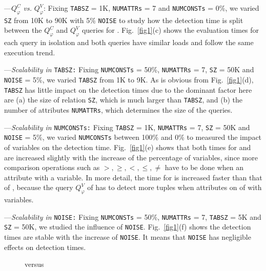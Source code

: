 \noindent---$Q_\varphi^C$ \textit{vs.} $Q_\varphi^V$: Fixing \texttt{TABSZ} = 1K, \texttt{NUMATTRs} = 7 and \texttt{NUMCONSTs} = 0\%, we varied \texttt{SZ} from 10K to 90K with 5\% \texttt{NOISE} to study how the detection time is split between the $Q_\varphi^C$ and $Q_\varphi^V$ queries for \pCFDs. Fig.~\ref{fig1}(c) shows the evaluation times for each query in isolation and both queries have similar loads and follow the same execution trend.

\noindent---\textit{Scalability in} \texttt{TABSZ:} Fixing \texttt{NUMCONSTs} = 50\%, \texttt{NUMATTRs} = 7, \texttt{SZ} = 50K and \texttt{NOISE} = 5\%, we varied \texttt{TABSZ} from 1K to 9K. As is obvious from Fig.~\ref{fig1}(d), \texttt{TABSZ} has little impact on the detection times due to the dominant factor here are (a) the size of relation \texttt{SZ}, which is much larger than \texttt{TABSZ}, and (b) the number of attributes \texttt{NUMATTRs}, which determines the size of the queries.

\noindent---\textit{Scalability in} \texttt{NUMCONSTs:} Fixing \texttt{TABSZ} = 1K, \texttt{NUMATTRs} = 7, \texttt{SZ} = 50K and \texttt{NOISE} = 5\%, we varied \texttt{NUMCONSTs} between 100\% and 0\% to measured the impact of variables on the detection time. Fig.~\ref{fig1}(e) shows that both times for \pCFDs and \pCINDs are increased slightly with the increase of the percentage of variables, since more comparison operations such as $>, \geq, <, \leq, \neq$ have to be done when an attribute with a variable. In more detail, the time for \pCFDs is increased faster than that of \pCINDs, because the query $Q_\varphi^V$ of \pCFDs has to detect more tuples when attributes on \RHS of \pCFDs with variables.

\noindent---\textit{Scalability in} \texttt{NOISE:} Fixing \texttt{NUMCONSTs} = 50\%, \texttt{NUMATTRs} = 7, \texttt{TABSZ} = 5K and \texttt{SZ} = 50K, we studied the influence of \texttt{NOISE}. Fig.~\ref{fig1}(f) shows the detection times are stable with the increase of \texttt{NOISE}. It means that \texttt{NOISE} has negligible effects on detection times.



\begin{figure*}
  \centering
  \caption{\pCFDs versus \CFDs}\label{fig2}
\end{figure*}

